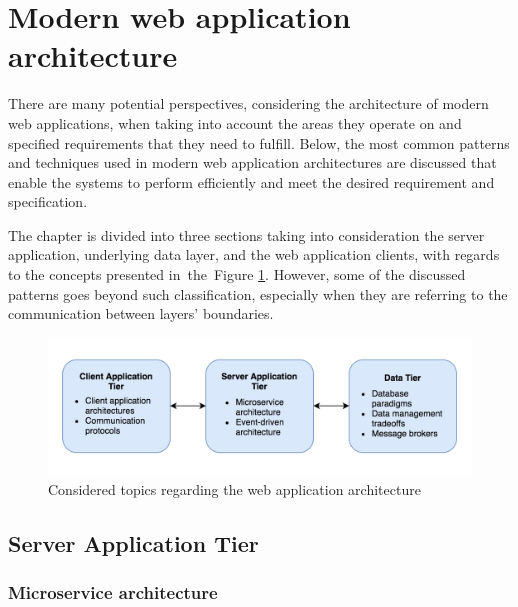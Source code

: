 \section{Modern web application architecture} \label{section:web-apps-modern-web-application-architecture}

There are many potential perspectives, considering the architecture of modern web applications, when taking into account the areas they operate on and specified requirements that they need to fulfill. Below, the most common patterns and techniques used in modern web application architectures are discussed that enable the systems to perform efficiently and meet the desired requirement and specification. 

The chapter is divided into three sections taking into consideration the server application, underlying data layer, and the web application clients, with regards to the concepts presented in~the~Figure \ref{fig:web-app-architecture-concepts}. However, some of the discussed patterns goes beyond such classification, especially when they are referring to the communication between layers' boundaries.

\begin{figure}[h]
    \centering
    \includegraphics[width=1\textwidth]{assets/03-web-applications/WebAppLayers.png}
    \caption{Considered topics regarding the web application architecture}
    \label{fig:web-app-architecture-concepts}
\end{figure}

\subsection{Server Application Tier}

\subsubsection{Microservice architecture} \label{section:web-apps-microservices}

